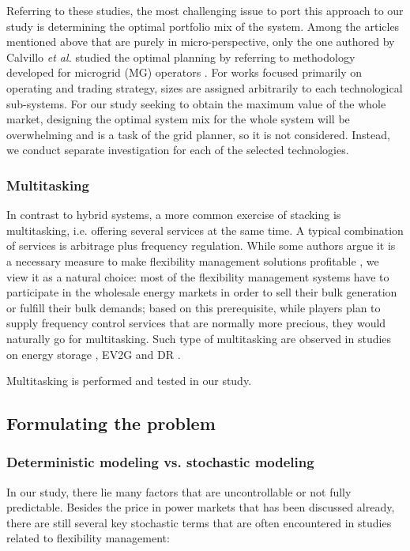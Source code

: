 Referring to these studies, the most challenging issue to port this approach to our study is determining the optimal portfolio mix of the system. Among the articles mentioned above that are purely in micro-perspective, only the one authored by Calvillo \textit{et al.} \cite{Calvillo2016} studied the optimal planning by referring to methodology developed for microgrid (MG) operators \cite{Martin-Martinez2016}. For works focused primarily on operating and trading strategy, sizes are assigned arbitrarily to each technological sub-systems. For our study seeking to obtain the maximum value of the whole market, designing the optimal system mix for the whole system will be overwhelming and is a task of the grid planner, so it is not considered. Instead, we conduct separate investigation for each of the selected technologies.

\subsubsection{Multitasking}
In contrast to hybrid systems, a more common exercise of stacking is multitasking, i.e. offering several services at the same time. A typical combination of services is arbitrage plus frequency regulation. While some authors argue it is a necessary measure to make flexibility management solutions profitable \cite{Zucker2013,Megel2017}, we view it as a natural choice: most of the flexibility management systems have to participate in the wholesale energy markets in order to sell their bulk generation or fulfill their bulk demands; based on this prerequisite, while players plan to supply frequency control services that are normally more precious, they would naturally go for multitasking. Such type of multitasking are observed in studies on energy storage \cite{Byrne2012, Berrada2016,Megel2017}, EV2G \cite{Sortomme2012,Cho2015,Alipour2017,Peng2017} and DR \cite{Roos2014}.

Multitasking is performed and tested in our study.

\subsection{Formulating the problem}
\label{sec:formulating-solving}

\subsubsection{Deterministic modeling vs. stochastic modeling}
In our study, there lie many factors that are uncontrollable or not fully predictable. Besides the price in power markets that has been discussed already, there are still several key stochastic terms that are often encountered in studies related to flexibility management: 

